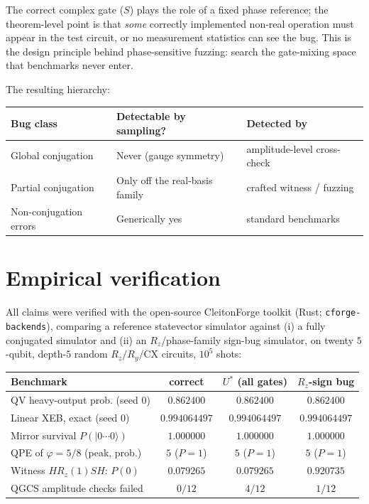 \documentclass[11pt]{article}
\theoremstyle{definition}
\theoremstyle{remark}
\newcommand{\ket}[1]{\lvert #1 \rangle}
\begin{document}
The correct complex gate ($S$) plays the role of a fixed phase
reference; the theorem-level point is that \emph{some} correctly
implemented non-real operation must appear in the test circuit, or no
measurement statistics can see the bug. This is the design principle
behind phase-sensitive fuzzing: search the gate-mixing space that
benchmarks never enter.

The resulting hierarchy:

\begin{center}
\begin{tabular}{lll}
\toprule
Bug class & Detectable by sampling? & Detected by \\
\midrule
Global conjugation & Never (gauge symmetry) & amplitude-level cross-check \\
Partial conjugation & Only off the real-basis family & crafted witness / fuzzing \\
Non-conjugation errors & Generically yes & standard benchmarks \\
\bottomrule
\end{tabular}
\end{center}

\section{Empirical verification}

All claims were verified with the open-source CleitonForge toolkit
(Rust; \texttt{cforge-backends}), comparing a reference statevector
simulator against (i) a fully conjugated simulator and (ii) an
$R_z$/phase-family sign-bug simulator, on twenty $5$-qubit, depth-$5$
random $R_z/R_y/\mathrm{CX}$ circuits, $10^{5}$ shots:

\begin{center}
\begin{tabular}{lccc}
\toprule
Benchmark & correct & $U^{*}$ (all gates) & $R_z$-sign bug \\
\midrule
QV heavy-output prob. (seed 0) & $0.862400$ & $0.862400$ & $0.862400$ \\
Linear XEB, exact (seed 0) & $0.994064497$ & $0.994064497$ & $0.994064497$ \\
Mirror survival $P(\ket{0\cdots0})$ & $1.000000$ & $1.000000$ & $1.000000$ \\
QPE of $\varphi = 5/8$ (peak, prob.) & $5$ ($P{=}1$) & $5$ ($P{=}1$) & $5$ ($P{=}1$) \\
\midrule
Witness $H R_z(1) S H$: $P(0)$ & $0.079265$ & $0.079265$ & $0.920735$ \\
QGCS amplitude checks failed & $0/12$ & $4/12$ & $1/12$ \\
\bottomrule
\end{tabular}
\end{center}
\end{document}
